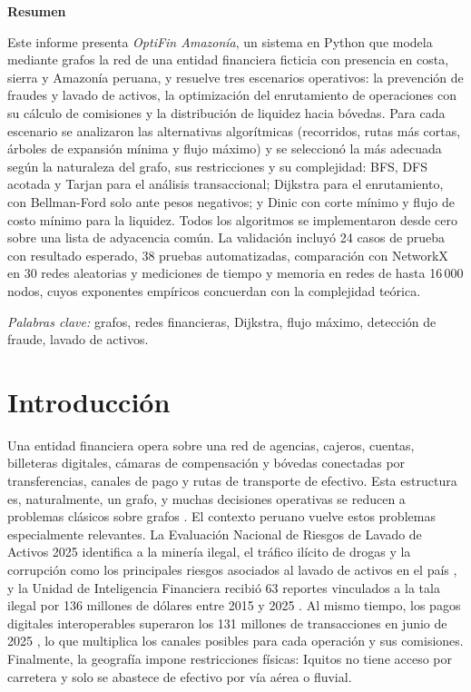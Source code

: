 \documentclass[11pt,a4paper]{article}
\begin{document}
\begin{center}{\large\bfseries Resumen}\end{center}
\vspace{-4pt}
\noindent Este informe presenta \textit{OptiFin Amazonía}, un sistema en Python que modela mediante grafos la red de
una entidad financiera ficticia con presencia en costa, sierra y Amazonía peruana, y resuelve tres escenarios
operativos: la prevención de fraudes y lavado de activos, la optimización del enrutamiento de operaciones con su
cálculo de comisiones y la distribución de liquidez hacia bóvedas. Para cada escenario se analizaron las
alternativas algorítmicas (recorridos, rutas más cortas, árboles de expansión mínima y flujo máximo) y se
seleccionó la más adecuada según la naturaleza del grafo, sus restricciones y su complejidad: BFS, DFS acotada y
Tarjan para el análisis transaccional; Dijkstra para el enrutamiento, con Bellman-Ford solo ante pesos negativos;
y Dinic con corte mínimo y flujo de costo mínimo para la liquidez. Todos los algoritmos se implementaron desde cero
sobre una lista de adyacencia común. La validación incluyó 24 casos de prueba con resultado esperado, 38 pruebas
automatizadas, comparación con NetworkX en 30 redes aleatorias y mediciones de tiempo y memoria en redes de hasta
16\,000 nodos, cuyos exponentes empíricos concuerdan con la complejidad teórica.

\vspace{3pt}
\noindent\textit{Palabras clave:} grafos, redes financieras, Dijkstra, flujo máximo, detección de fraude, lavado de activos.

\section{Introducción}

Una entidad financiera opera sobre una red de agencias, cajeros, cuentas, billeteras digitales, cámaras de
compensación y bóvedas conectadas por transferencias, canales de pago y rutas de transporte de efectivo. Esta
estructura es, naturalmente, un grafo, y muchas decisiones operativas se reducen a problemas clásicos sobre grafos
\citep{cormen2022}. El contexto peruano vuelve estos problemas especialmente relevantes. La Evaluación Nacional de
Riesgos de Lavado de Activos 2025 identifica a la minería ilegal, el tráfico ilícito de drogas y la corrupción
como los principales riesgos asociados al lavado de activos en el país \citep{sbs2026spla}, y la Unidad de
Inteligencia Financiera recibió 63 reportes vinculados a la tala ilegal por 136 millones de dólares entre 2015 y
2025 \citep{sbs2025ambiental}. Al mismo tiempo, los pagos digitales interoperables superaron los 131 millones de
transacciones en junio de 2025 \citep{bcrp2025interop}, lo que multiplica los canales posibles para cada operación
y sus comisiones. Finalmente, la geografía impone restricciones físicas: Iquitos no tiene acceso por carretera y solo se abastece de efectivo
por vía aérea o fluvial.
\end{document}
